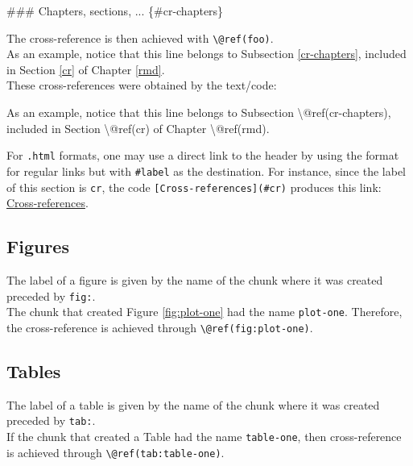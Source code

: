 \documentclass[]{book}
\newenvironment{Shaded}{}{}
\newcommand{\FunctionTok}[1]{\textcolor[rgb]{0.02,0.16,0.49}{#1}}
\newcommand{\NormalTok}[1]{#1}
\theoremstyle{definition}
\theoremstyle{definition}
\theoremstyle{definition}
\theoremstyle{remark}
\begin{document}
\begin{Shaded}
\begin{Highlighting}[]
\FunctionTok{### Chapters, sections, ... \{#cr-chapters\}}
\end{Highlighting}
\end{Shaded}

The cross-reference is then achieved with
\texttt{\textbackslash{}@ref(foo)}.\\
As an example, notice that this line belongs to Subsection
\ref{cr-chapters}, included in Section \ref{cr} of Chapter \ref{rmd}.\\
These cross-references were obtained by the text/code:

\begin{Shaded}
\begin{Highlighting}[]
\NormalTok{As an example, notice that this line belongs to Subsection \textbackslash{}@ref(cr-chapters), }
\NormalTok{included in Section \textbackslash{}@ref(cr) of Chapter \textbackslash{}@ref(rmd).}
\end{Highlighting}
\end{Shaded}

For \texttt{.html} formats, one may use a direct link to the header by
using the format for regular links but with \texttt{\#label} as the
destination. For instance, since the label of this section is
\texttt{cr}, the code \texttt{{[}Cross-references{]}(\#cr)} produces
this link: \protect\hyperlink{cr}{Cross-references}.

\hypertarget{figures-1}{%
\subsection{Figures}\label{figures-1}}

The label of a figure is given by the name of the chunk where it was
created preceded by \texttt{fig:}.\\
The chunk that created Figure \ref{fig:plot-one} had the name
\texttt{plot-one}. Therefore, the cross-reference is achieved through
\texttt{\textbackslash{}@ref(fig:plot-one)}.

\hypertarget{tables}{%
\subsection{Tables}\label{tables}}

The label of a table is given by the name of the chunk where it was
created preceded by \texttt{tab:}.\\
If the chunk that created a Table had the name \texttt{table-one}, then
cross-reference is achieved through
\texttt{\textbackslash{}@ref(tab:table-one)}.
\end{document}
